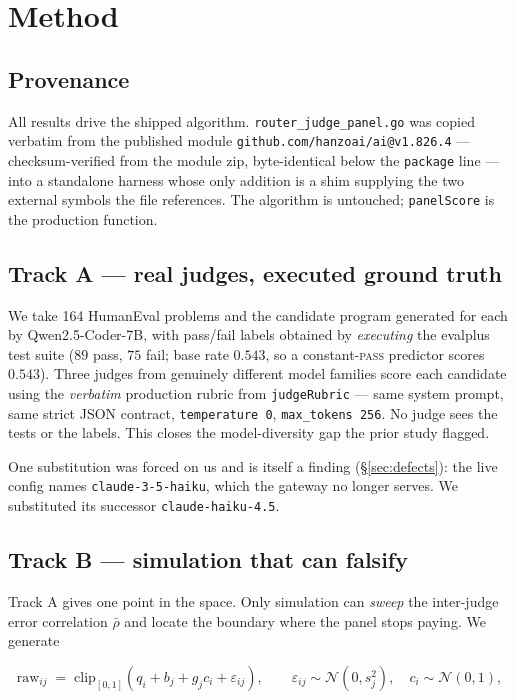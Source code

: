 \documentclass[11pt]{article}
\theoremstyle{definition}
\newcommand{\rhobar}{\ensuremath{\bar{\rho}}}
\begin{document}
\section{Method}

\subsection{Provenance}

All results drive the shipped algorithm. \texttt{router\_judge\_panel.go} was copied verbatim
from the published module \texttt{github.com/hanzoai/ai@v1.826.4} --- checksum-verified from
the module zip, byte-identical below the \texttt{package} line --- into a standalone harness
whose only addition is a shim supplying the two external symbols the file references. The
algorithm is untouched; \texttt{panelScore} is the production function.

\subsection{Track A --- real judges, executed ground truth}

We take 164 HumanEval problems and the candidate program generated for each by
Qwen2.5-Coder-7B, with pass/fail labels obtained by \emph{executing} the evalplus test suite
($89$ pass, $75$ fail; base rate $0.543$, so a constant-\textsc{pass} predictor scores
$0.543$). Three judges from genuinely different model families score each candidate using the
\emph{verbatim} production rubric from \texttt{judgeRubric} --- same system prompt, same strict
JSON contract, \texttt{temperature 0}, \texttt{max\_tokens 256}. No judge sees the tests or
the labels. This closes the model-diversity gap the prior study flagged.

One substitution was forced on us and is itself a finding (\S\ref{sec:defects}): the live
config names \texttt{claude-3-5-haiku}, which the gateway no longer serves. We substituted its
successor \texttt{claude-haiku-4.5}.

\subsection{Track B --- simulation that can falsify}

Track A gives one point in the space. Only simulation can \emph{sweep} the inter-judge error
correlation \rhobar{} and locate the boundary where the panel stops paying. We generate

\[
\text{raw}_{ij} \;=\; \mathrm{clip}_{[0,1]}\!\left(q_i + b_j + g_j c_i + \varepsilon_{ij}\right),
\qquad \varepsilon_{ij}\sim\mathcal N(0,s_j^2),\quad c_i\sim\mathcal N(0,1),
\]
\end{document}

